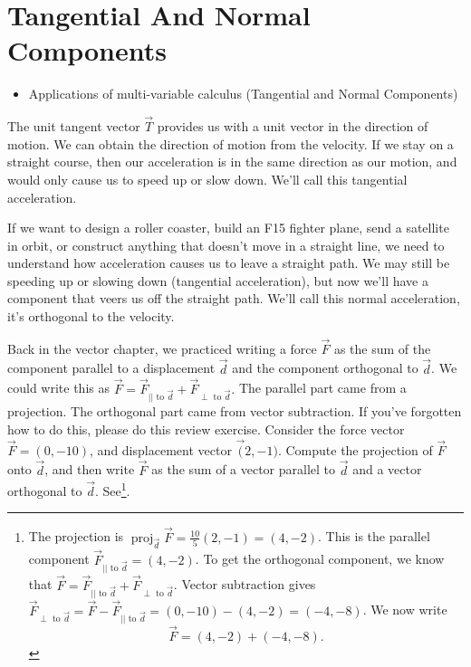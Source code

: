 \documentclass[10pt,]{book}
\theoremstyle{plain}
\theoremstyle{definition}
\theoremstyle{definition}
\theoremstyle{definition}
\theoremstyle{definition}
\theoremstyle{definition}
\numberwithin{equation}{section}
\DeclareMathOperator{\proj}{proj}
\begin{document}
\section[{Tangential And Normal Components}]{Tangential And Normal Components}\label{section-28}
\leavevmode%
\begin{itemize}[label=\textbullet]
\item{}Applications of multi-variable calculus (Tangential and Normal Components)%
\end{itemize}
The unit tangent vector \(\vec T\) provides us with a unit vector in the direction of motion. We can obtain the direction of motion from the velocity. If we stay on a straight course, then our acceleration is in the same direction as our motion, and would only cause us to speed up or slow down. We'll call this tangential acceleration.%
\par
If we want to design a roller coaster, build an F15 fighter plane, send a satellite in orbit, or construct anything that doesn't move in a straight line, we need to understand how acceleration causes us to leave a straight path. We may still be speeding up or slowing down (tangential acceleration), but now we'll have a component that veers us off the straight path. We'll call this normal acceleration, it's orthogonal to the velocity.%
\par
Back in the vector chapter, we practiced writing a force \(\vec F\) as the sum of the component parallel to a displacement \(\vec d\) and the component orthogonal to \(\vec d\). We could write this as \(\vec F = \vec F_{|| \text{ to } \vec d} + \vec F_{\perp \text{ to } \vec d}.\) The parallel part came from a projection. The orthogonal part came from vector subtraction. If you've forgotten how to do this, please do this review exercise.%
Consider the force vector \(\vec F = (0,-10)\), and displacement vector \(\vec (2,-1)\). Compute the projection of \(\vec F\) onto \(\vec d\), and then write \(\vec F\) as the sum of a vector parallel to \(\vec d\) and a vector orthogonal to \(\vec d\). See\footnote{The projection is \(\proj_{\vec d}\vec F = \frac{10}{5}(2,-1) = (4,-2)\).  This is the parallel component \(\vec F_{|| \text{ to } \vec d} =(4,-2)\).  To get the orthogonal component, we know that \(\vec F = \vec F_{|| \text{ to } \vec d} + \vec F_{\perp \text{ to } \vec d}\). Vector subtraction gives \(\vec F_{\perp \text{ to } \vec d} = \vec F -\vec F_{|| \text{ to } \vec d} = (0,-10)-(4,-2) = (-4,-8)\). We now write%
\begin{equation*}
\vec F = (4,-2) + (-4,-8).
\end{equation*}
\label{fn-15}}. %
\end{document}
